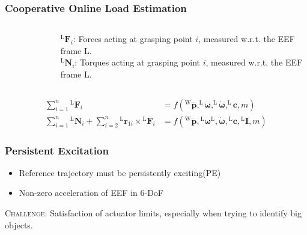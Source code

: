 \documentclass[student,noshadow]{ITRslides}
\renewcommand{\vec}[1]{\boldsymbol{#1}}
\renewcommand{\vec}[1]{\boldsymbol{#1}}
\newcommand{\scr}[1]{\mathrm{#1}}
\begin{document}
\begin{frame}
	\frametitle{Cooperative Online Load Estimation}
	\begin{columns}
			\begin{column}{0.5\textwidth}
				\begin{figure}
					\centering
					
				\end{figure}	
		 	\end{column}
		 	\begin{column}{0.5\textwidth}
		 	$^\scr{L}\vec{F}_i$: Forces acting at grasping point $i$, measured w.r.t. the EEF frame L.\\ \vspace{0.3cm}
		 	$^\scr{L}\vec{N}_i$: Torques acting at grasping point $i$, measured w.r.t. the EEF frame L.\\
		 	\end{column}
	\end{columns}

\begin{align*} 
\sum_{i = 1}^{n}  {^\scr{L}}\vec{F}_{i} &=  f\left(^\scr{W}\vec{\ddot{p}},^\scr{L}\vec{\omega},^\scr{L}\vec{\dot{\omega}},^\scr{L}\vec{c},m\right) \\ 
\sum_{i = 1}^n {^\scr{L}}\vec{N}_{i} + \sum_{i = 2}^n {^\scr{L}}\vec{r}_{1i} \times {^\scr{L}}\vec{F}_{i} &= f\left({^\scr{W}}\vec{\ddot{p}},{^\scr{L}}\vec{\omega}{^\scr{L}},\vec{\dot{\omega}},{^\scr{L}}\vec{c},{^\scr{L}}\vec{I},m\right)
\end{align*}
\end{frame}

\begin{frame}
	\frametitle{Persistent Excitation}
	\vspace{1cm}	
	\begin{itemize}
		\item Reference trajectory must be persistently exciting(PE)
		\item Non-zero acceleration of EEF in 6-DoF \cite{literaturstelle3}
	\end{itemize}
	\vspace{1cm}
	\textsc{Challenge}: Satisfaction of actuator limits, especially when trying to identify big objects.
\end{frame}
\end{document}
